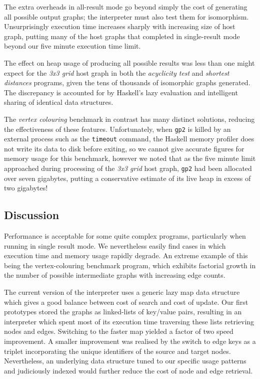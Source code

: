 The extra overheads in all-result mode go beyond simply the cost of generating all possible output graphs; the interpreter must also test them for isomorphism. Unsurprisingly execution time increases sharply with increasing size of host graph, putting many of the host graphs that completed in single-result mode beyond our five minute execution time limit.

The effect on heap usage of producing all possible results was less than one might expect for the \textit{3x3 grid} host graph in both the \textit{acyclicity test} and \textit{shortest distances} programs, given the tens of thousands of isomorphic graphs generated. The discrepancy is accounted for by Haskell's lazy evaluation and intelligent sharing of identical data structures.

The \textit{vertex colouring} benchmark in contrast has many distinct solutions, reducing the effectiveness of these features. Unfortunately, when \texttt{gp2} is killed by an external process such as the \texttt{timeout} command, the Haskell memory profiler does not write its data to disk before exiting, so we cannot give accurate figures for memory usage for this benchmark, however we noted that as the five minute limit approached during processing of the \textit{3x3 grid} host graph, \texttt{gp2} had been allocated over seven gigabytes, putting a conservative estimate of its live heap in excess of two gigabytes!


\subsection{Discussion}

Performance is acceptable for some quite complex programs, particularly when running in single result mode. We nevertheless easily find cases in which execution time and memory usage rapidly degrade. An extreme example of this being the vertex-colouring benchmark program, which exhibits factorial growth in the number of possible intermediate graphs with increasing edge counts.

The current version of the interpreter uses a generic lazy map data structure which gives a good balance between cost of search and cost of update. Our first prototypes stored the graphs as linked-lists of key/value pairs, resulting in an interpreter which spent most of its execution time traversing these lists retrieving nodes and edges. Switching to the faster map yielded a factor of two speed improvement. A smaller improvement was realised by the switch to edge keys as a triplet incorporating the unique identifiers of the source and target nodes. Nevertheless, an underlying data structure tuned to our specific usage patterns and judiciously indexed would further reduce the cost of node and edge retrieval.

